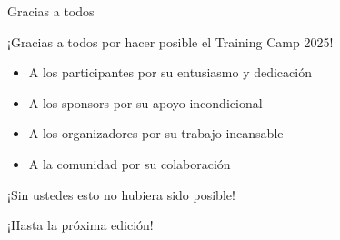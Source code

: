 \documentclass{beamer}
\begin{document}
\begin{frame}{Gracias a todos}
\begin{center}
\Large
¡Gracias a todos por hacer posible el Training Camp 2025!

\vspace{1cm}

\begin{itemize}
\item A los participantes por su entusiasmo y dedicación
\item A los sponsors por su apoyo incondicional
\item A los organizadores por su trabajo incansable
\item A la comunidad por su colaboración
\end{itemize}

\vspace{1cm}

¡Sin ustedes esto no hubiera sido posible!

\vspace{1cm}

¡Hasta la próxima edición!
\end{center}
\end{frame}
\end{document}
